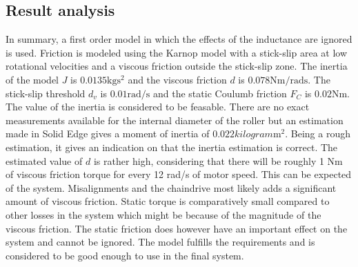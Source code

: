 \subsection{Result analysis}
In summary, a first order model in which the effects of the inductance are
ignored is used. Friction is modeled using the Karnop model with a stick-slip
area at low rotational velocities and a viscous friction outside the stick-slip
zone. The inertia of the model $J$ is $0.0135 \si{\kilogram\second^{2}}$ and the
viscous friction $d$ is $0.078 \si{\newton\meter\per\radian\second}$. The
stick-slip threshold $d_v$ is $0.01 \si{\radian\per\second}$ and the static
Coulumb friction $F_C$ is $0.02 \si{\newton\meter}$. The value of the inertia is
considered to be feasable. There are no exact measurements available for the
internal diameter of the roller but an estimation made in Solid Edge gives a
moment of inertia of $0.022 \si{kilogram\meter^{2}}$. Being a rough estimation,
it gives an indication on that the inertia estimation is correct. The estimated
value of $d$ is rather high, considering that there will be roughly 1 Nm of
viscous friction torque for every 12 rad/s of motor speed. This can be expected
of the system. Misalignments and the chaindrive most likely adds a significant
amount of viscous friction. Static torque is comparatively small compared to
other losses in the system which might be because of the magnitude of the
viscous friction. The static friction does however have an important effect on
the system and cannot be ignored. The model fulfills the requirements and is
considered to be good enough to use in the final system.
